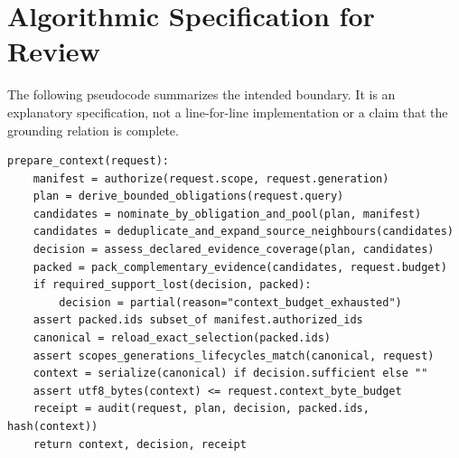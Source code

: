 \documentclass[11pt]{article}
\begin{document}
\section{Algorithmic Specification for Review}
The following pseudocode summarizes the intended boundary. It is an explanatory specification, not a line-for-line implementation or a claim that the grounding relation is complete.
\begin{lstlisting}
prepare_context(request):
    manifest = authorize(request.scope, request.generation)
    plan = derive_bounded_obligations(request.query)
    candidates = nominate_by_obligation_and_pool(plan, manifest)
    candidates = deduplicate_and_expand_source_neighbours(candidates)
    decision = assess_declared_evidence_coverage(plan, candidates)
    packed = pack_complementary_evidence(candidates, request.budget)
    if required_support_lost(decision, packed):
        decision = partial(reason="context_budget_exhausted")
    assert packed.ids subset_of manifest.authorized_ids
    canonical = reload_exact_selection(packed.ids)
    assert scopes_generations_lifecycles_match(canonical, request)
    context = serialize(canonical) if decision.sufficient else ""
    assert utf8_bytes(context) <= request.context_byte_budget
    receipt = audit(request, plan, decision, packed.ids, hash(context))
    return context, decision, receipt
\end{lstlisting}

\clearpage
\end{document}
